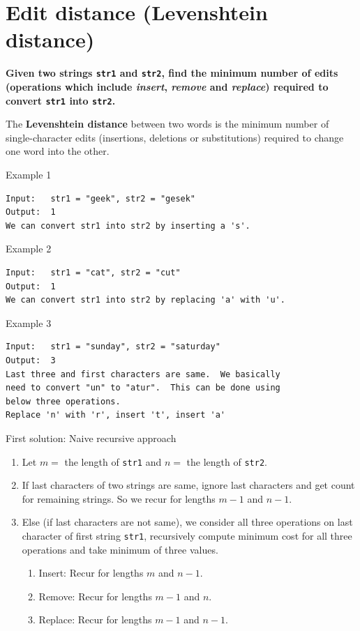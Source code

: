 \documentclass[a4paper,11pt]{book}
\begin{document}
\newpage
\section{Edit distance (Levenshtein distance)}

\textbf{Given two strings \lstinline{str1} and \lstinline{str2}, find the minimum number of edits (operations which include \textit{insert}, \textit{remove} and \textit{replace}) required to convert \lstinline{str1} into \lstinline{str2}.  }

\vspace{5mm}
\noindent The \textbf{Levenshtein distance} between two words is the minimum number of single-character edits (insertions, deletions or substitutions) required to change one word into the other.
\vspace{5mm}

\noindent Example 1
\begin{lstlisting}
Input:   str1 = "geek", str2 = "gesek"
Output:  1
We can convert str1 into str2 by inserting a 's'.
\end{lstlisting}
\noindent Example 2
\begin{lstlisting}
Input:   str1 = "cat", str2 = "cut"
Output:  1
We can convert str1 into str2 by replacing 'a' with 'u'.
\end{lstlisting}
\noindent Example 3
\begin{lstlisting}
Input:   str1 = "sunday", str2 = "saturday"
Output:  3
Last three and first characters are same.  We basically
need to convert "un" to "atur".  This can be done using
below three operations. 
Replace 'n' with 'r', insert 't', insert 'a'
\end{lstlisting}

\noindent First solution: Naive recursive approach

\begin{enumerate}
\item Let $m = $ the length of \lstinline{str1} and $n=$ the length of \lstinline{str2}.
\item If last characters of two strings are same, ignore last characters and get count for remaining strings. So we recur for lengths $m-1$ and $n-1$.
\item Else (if last characters are not same), we consider all three operations on last character of first string \lstinline{str1}, recursively compute minimum cost for all three operations and take minimum of three values.
\begin{enumerate}
	\item Insert: Recur for lengths $m$ and $n-1$.
	\item Remove: Recur for lengths $m-1$ and $n$.
	\item Replace: Recur for lengths $m-1$ and $n-1$.
\end{enumerate}
\end{enumerate}
\end{document}
